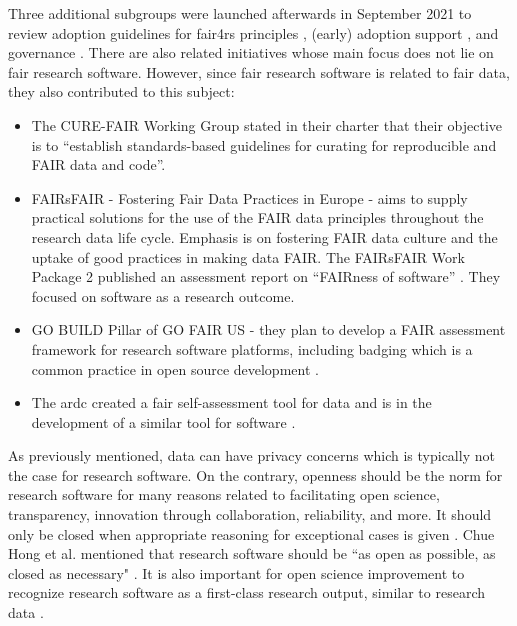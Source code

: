 Three additional subgroups were launched afterwards in September 2021 \cite{chue_hong_fair4rs_2022} to review adoption guidelines for \acrshort{fair4rs} principles \cite{martinez_survey_2022}, (early) adoption support \cite{martinez-ortiz_fair4rs_2022}, and governance \cite{honeyman_subgroup_nodate}.  
There are also related initiatives whose main focus does not lie on \acrshort{fair} research software. However, since \acrshort{fair} research software is related to \acrshort{fair} data, they also contributed to this subject:
\begin{itemize}
    \item The CURE-FAIR Working Group stated in their charter \cite{cure-faircase} that their objective is to “establish standards-based guidelines for curating for reproducible and FAIR data and code”.
    \item FAIRsFAIR - Fostering Fair Data Practices in Europe - aims to supply practical solutions for the use of the FAIR data principles throughout the research data life cycle. Emphasis is on fostering FAIR data culture and the uptake of good practices in making data FAIR. The FAIRsFAIR Work Package 2 published an assessment report on “FAIRness of software” \cite{gruenpeter_m215_2020}. They focused on software as a research outcome.
    \item GO BUILD Pillar of GO FAIR US - they plan to develop a FAIR assessment framework for research software platforms, including badging which is a common practice in open source development \cite{noauthor_go_nodate}.
    \item The \acrfull{ardc} created a \acrshort{fair} self-assessment tool for data \cite{ardcfair} and is in the development of a similar tool for software \cite{ardcfairsoftware}.  
\end{itemize}

As previously mentioned, data can have privacy concerns which is typically not the case for research software. On the contrary, openness should be the norm for research software for many reasons related to facilitating open science, transparency, innovation through collaboration, reliability, and more. It should only be closed when appropriate reasoning for exceptional cases is given \cite{hasselbring_fair_2020}. Chue Hong et al. mentioned that research software should be “as open as possible, as closed as necessary" \cite{chue_hong_fair_2021}. It is also important for open science improvement to recognize research software as a first-class research output, similar to research data \cite{gruenpeter_software_2021, akhmerov_making_2019, chue_hong_making_2019, garcia_castro_software_2020}.

